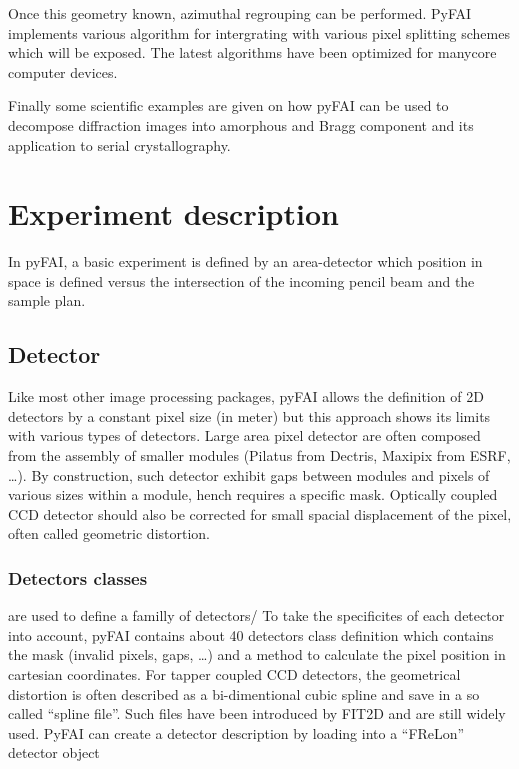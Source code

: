 \documentclass[preprint]{iucr}
\begin{document}
Once this geometry known, azimuthal regrouping can be performed. 
PyFAI implements various algorithm for intergrating with various pixel splitting
schemes which will be exposed. 
The latest algorithms have been optimized for
manycore computer devices.

Finally some scientific examples are given on how pyFAI can be used to decompose 
diffraction images into amorphous and Bragg component and its application
to serial crystallography.
 
\section{Experiment description}
In pyFAI, a basic experiment is defined by an area-detector which position in
space is defined versus the intersection of the incoming pencil beam and the
sample plan.

\subsection{Detector}
Like most other image processing packages, pyFAI allows the definition of 2D
detectors by a constant pixel size (in meter) but this approach shows its limits
with various types of detectors.
Large area pixel detector are often composed from the assembly of smaller
modules (Pilatus from Dectris, Maxipix from ESRF, \ldots). 
By construction, such detector exhibit gaps between modules and pixels of
various sizes within a module, hench requires a specific mask.
Optically coupled CCD detector should also be corrected
for small spacial displacement of the pixel, often called geometric distortion.

\subsubsection{Detectors classes} are used to define a familly of detectors/ 
To take the specificites of each detector into account, pyFAI contains about
40 detectors class definition which contains the mask (invalid pixels, gaps,
\ldots) and a method to calculate the pixel position in cartesian coordinates.
For tapper coupled CCD detectors, the geometrical distortion is often
described as a bi-dimentional cubic spline and save in a so called ``spline
file''. 
Such files have been introduced by FIT2D \cite{fit2d} and are still widely
used. PyFAI can create a detector description by loading into a ``FReLon''
detector object
\end{document}
